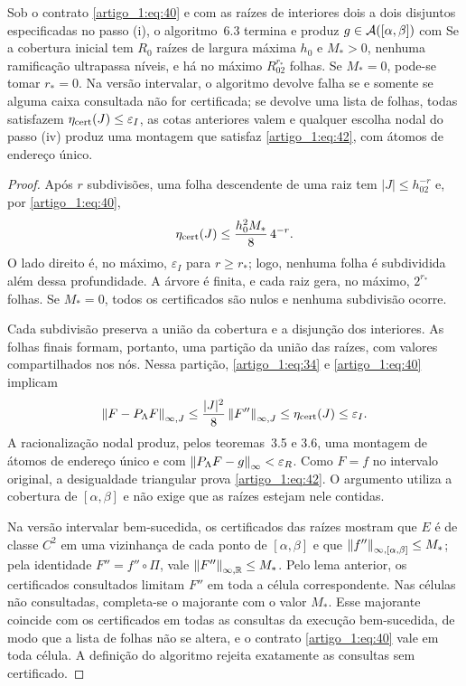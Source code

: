 \begin{teorema}\label{map:artigo_1:6.4}
Sob o contrato \eqref{artigo_1:eq:40} e com as raízes de interiores dois a dois disjuntos especificadas no passo (i), o algoritmo~6.3 termina e produz $g\in\mathcal A([\alpha,\beta])$ com
Se a cobertura inicial tem $R_0$ raízes de largura máxima $h_0$ e $M_*>0$, nenhuma ramificação ultrapassa
níveis, e há no máximo $R_02^{r_*}$ folhas. Se $M_*=0$, pode-se tomar $r_*=0$. Na versão intervalar, o algoritmo devolve falha se e somente se alguma caixa consultada não for certificada; se devolve uma lista de folhas, todas satisfazem $\eta_{\rm cert}(J)\le\varepsilon_I$, as cotas anteriores valem e qualquer escolha nodal do passo (iv) produz uma montagem que satisfaz \eqref{artigo_1:eq:42}, com átomos de endereço único.
\end{teorema}
\begin{proof}
Após $r$ subdivisões, uma folha descendente de uma raiz tem $|J|\le h_02^{-r}$ e, por \eqref{artigo_1:eq:40},
\[
\eta_{\rm cert}(J)\le\frac{h_0^2M_*}8\,4^{-r}.
\]
O lado direito é, no máximo, $\varepsilon_I$ para $r\ge r_*$; logo, nenhuma folha é subdividida além dessa profundidade. A árvore é finita, e cada raiz gera, no máximo, $2^{r_*}$ folhas. Se $M_*=0$, todos os certificados são nulos e nenhuma subdivisão ocorre.

Cada subdivisão preserva a união da cobertura e a disjunção dos interiores. As folhas finais formam, portanto, uma partição da união das raízes, com valores compartilhados nos nós. Nessa partição, \eqref{artigo_1:eq:34} e \eqref{artigo_1:eq:40} implicam
\[
\left\|F-P_\Lambda F\right\|_{\infty,J}\le\frac{|J|^2}8\left\|F''\right\|_{\infty,J}\le\eta_{\rm cert}(J)\le\varepsilon_I.
\]
A racionalização nodal produz, pelos teoremas~3.5 e 3.6, uma montagem de átomos de endereço único e com $\left\|P_\Lambda F-g\right\|_{\infty}<\varepsilon_R$. Como $F=f$ no intervalo original, a desigualdade triangular prova \eqref{artigo_1:eq:42}. O argumento utiliza a cobertura de $[\alpha,\beta]$ e não exige que as raízes estejam nele contidas.

Na versão intervalar bem-sucedida, os certificados das raízes mostram que $E$ é de classe $C^2$ em uma vizinhança de cada ponto de $[\alpha,\beta]$ e que $\left\|f''\right\|_{\infty,[\alpha,\beta]}\le M_*$; pela identidade $F''=f''\circ\Pi$, vale $\left\|F''\right\|_{\infty,\mathbb R}\le M_*$. Pelo lema anterior, os certificados consultados limitam $F''$ em toda a célula correspondente. Nas células não consultadas, completa-se o majorante com o valor $M_*$. Esse majorante coincide com os certificados em todas as consultas da execução bem-sucedida, de modo que a lista de folhas não se altera, e o contrato \eqref{artigo_1:eq:40} vale em toda célula. A definição do algoritmo rejeita exatamente as consultas sem certificado.
\end{proof}
